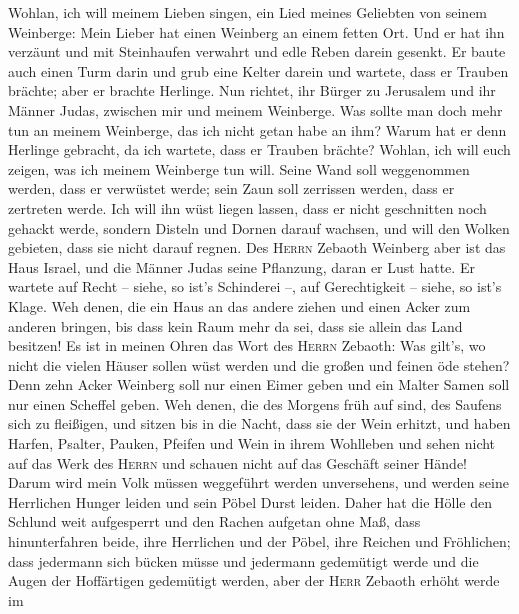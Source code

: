  Wohlan, ich will meinem Lieben singen, ein Lied meines
Geliebten von seinem Weinberge: Mein Lieber hat einen Weinberg an einem
fetten Ort.  Und er hat ihn verzäunt und mit Steinhaufen
verwahrt und edle Reben darein gesenkt. Er baute auch einen Turm darin
und grub eine Kelter darein und wartete, dass er Trauben brächte; aber
er brachte Herlinge.  Nun richtet, ihr Bürger zu Jerusalem
und ihr Männer Judas, zwischen mir und meinem Weinberge. 
Was sollte man doch mehr tun an meinem Weinberge, das ich nicht getan
habe an ihm? Warum hat er denn Herlinge gebracht, da ich wartete, dass
er Trauben brächte?  Wohlan, ich will euch zeigen, was ich
meinem Weinberge tun will. Seine Wand soll weggenommen werden, dass er
verwüstet werde; sein Zaun soll zerrissen werden, dass er zertreten
werde.  Ich will ihn wüst liegen lassen, dass er nicht
geschnitten noch gehackt werde, sondern Disteln und Dornen darauf
wachsen, und will den Wolken gebieten, dass sie nicht darauf regnen.
 Des \textsc{Herrn} Zebaoth Weinberg aber ist das Haus
Israel, und die Männer Judas seine Pflanzung, daran er Lust hatte. Er
wartete auf Recht -- siehe, so ist's Schinderei --, auf Gerechtigkeit --
siehe, so ist's Klage.  Weh denen, die ein Haus an das
andere ziehen und einen Acker zum anderen bringen, bis dass kein Raum
mehr da sei, dass sie allein das Land besitzen!  Es ist in
meinen Ohren das Wort des \textsc{Herrn} Zebaoth: Was gilt's, wo nicht
die vielen Häuser sollen wüst werden und die großen und feinen öde
stehen?  Denn zehn Acker Weinberg soll nur einen Eimer
geben und ein Malter Samen soll nur einen Scheffel geben.
 Weh denen, die des Morgens früh auf sind, des Saufens
sich zu fleißigen, und sitzen bis in die Nacht, dass sie der Wein
erhitzt,  und haben Harfen, Psalter, Pauken, Pfeifen und
Wein in ihrem Wohlleben und sehen nicht auf das Werk des \textsc{Herrn}
und schauen nicht auf das Geschäft seiner Hände!  Darum
wird mein Volk müssen weggeführt werden unversehens, und werden seine
Herrlichen Hunger leiden und sein Pöbel Durst leiden. 
Daher hat die Hölle den Schlund weit aufgesperrt und den Rachen aufgetan
ohne Maß, dass hinunterfahren beide, ihre Herrlichen und der Pöbel, ihre
Reichen und Fröhlichen;  dass jedermann sich bücken müsse
und jedermann gedemütigt werde und die Augen der Hoffärtigen gedemütigt
werden,  aber der \textsc{Herr} Zebaoth erhöht werde im

